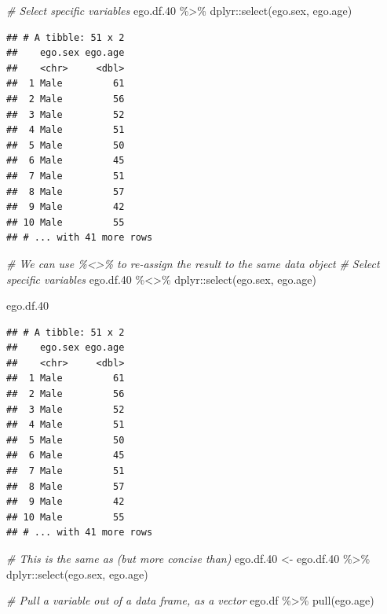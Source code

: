 \documentclass[
]{book}
\newenvironment{Shaded}{\begin{snugshade}}{\end{snugshade}}
\newcommand{\CommentTok}[1]{\textcolor[rgb]{0.56,0.35,0.01}{\textit{#1}}}
\newcommand{\FloatTok}[1]{\textcolor[rgb]{0.00,0.00,0.81}{#1}}
\newcommand{\FunctionTok}[1]{\textcolor[rgb]{0.00,0.00,0.00}{#1}}
\newcommand{\NormalTok}[1]{#1}
\newcommand{\OtherTok}[1]{\textcolor[rgb]{0.56,0.35,0.01}{#1}}
\newcommand{\SpecialCharTok}[1]{\textcolor[rgb]{0.00,0.00,0.00}{#1}}
\begin{document}
\begin{Shaded}
\begin{Highlighting}[]
\CommentTok{\# Select specific variables}
\NormalTok{ego.df}\FloatTok{.40} \SpecialCharTok{\%\textgreater{}\%}
\NormalTok{  dplyr}\SpecialCharTok{::}\FunctionTok{select}\NormalTok{(ego.sex, ego.age)}
\end{Highlighting}
\end{Shaded}

\begin{verbatim}
## # A tibble: 51 x 2
##    ego.sex ego.age
##    <chr>     <dbl>
##  1 Male         61
##  2 Male         56
##  3 Male         52
##  4 Male         51
##  5 Male         50
##  6 Male         45
##  7 Male         51
##  8 Male         57
##  9 Male         42
## 10 Male         55
## # ... with 41 more rows
\end{verbatim}

\begin{Shaded}
\begin{Highlighting}[]
\CommentTok{\# We can use \%\textless{}\textgreater{}\% to re{-}assign the result to the same data object}
\CommentTok{\# Select specific variables}
\NormalTok{ego.df}\FloatTok{.40} \SpecialCharTok{\%\textless{}\textgreater{}\%}
\NormalTok{  dplyr}\SpecialCharTok{::}\FunctionTok{select}\NormalTok{(ego.sex, ego.age)}

\NormalTok{ego.df}\FloatTok{.40}
\end{Highlighting}
\end{Shaded}

\begin{verbatim}
## # A tibble: 51 x 2
##    ego.sex ego.age
##    <chr>     <dbl>
##  1 Male         61
##  2 Male         56
##  3 Male         52
##  4 Male         51
##  5 Male         50
##  6 Male         45
##  7 Male         51
##  8 Male         57
##  9 Male         42
## 10 Male         55
## # ... with 41 more rows
\end{verbatim}

\begin{Shaded}
\begin{Highlighting}[]
\CommentTok{\# This is the same as (but more concise than)}
\NormalTok{ego.df}\FloatTok{.40} \OtherTok{\textless{}{-}}\NormalTok{ ego.df}\FloatTok{.40} \SpecialCharTok{\%\textgreater{}\%}
\NormalTok{  dplyr}\SpecialCharTok{::}\FunctionTok{select}\NormalTok{(ego.sex, ego.age)}

\CommentTok{\# Pull a variable out of a data frame, as a vector}
\NormalTok{ego.df }\SpecialCharTok{\%\textgreater{}\%}
  \FunctionTok{pull}\NormalTok{(ego.age)}
\end{Highlighting}
\end{Shaded}
\end{document}
